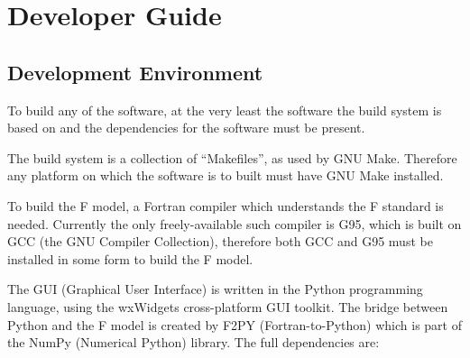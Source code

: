 \chapter{Developer Guide}









\section{Development Environment}
\label{dev:env}

To build any of the software, at the very least the software the build system is based on and the 
dependencies for the software must be present.

The build system is a collection of ``Makefiles'', as used by GNU Make.  Therefore any platform on 
which the software is to built must have GNU Make installed.

To build the F model, a Fortran compiler which understands the F standard is needed.  Currently the 
only freely-available such compiler is G95, which is built on GCC (the GNU Compiler Collection), 
therefore both GCC and G95 must be installed in some form to build the F model.

The GUI (Graphical User Interface) is written in the Python programming language, using the 
wxWidgets cross-platform GUI toolkit.  The bridge between Python and the F model is created by F2PY 
(Fortran-to-Python) which is part of the NumPy (Numerical Python) library.  The full dependencies 
are:

